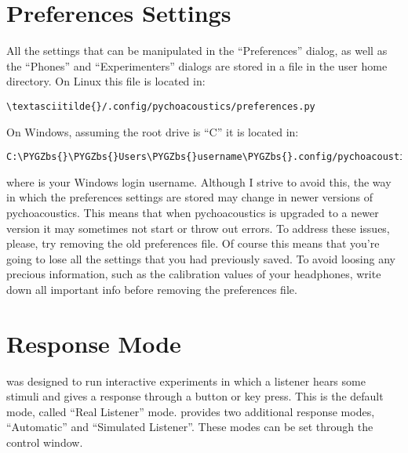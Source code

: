 \documentclass[a4paper,12pt,english]{sphinxmanual}
\def\PYGZbs{\char`\\}
\begin{document}
\section{Preferences Settings}
\label{engine:preferences-settings}
All the settings that can be manipulated in the
“Preferences” dialog, as well as the “Phones” and “Experimenters”
dialogs are stored in a file in the user home directory. On Linux this
file is located in:

\begin{Verbatim}[commandchars=\\\{\}]
\textasciitilde{}/.config/pychoacoustics/preferences.py
\end{Verbatim}

On Windows, assuming the root drive is “C” it is located in:

\begin{Verbatim}[commandchars=\\\{\}]
C:\PYGZbs{}\PYGZbs{}Users\PYGZbs{}username\PYGZbs{}.config/pychoacoustics\PYGZbs{}preferences.py
\end{Verbatim}

where  is your Windows login username. Although I strive to
avoid this, the way in which the preferences settings are stored may
change in newer versions of pychoacoustics. This means that when
pychoacoustics is upgraded to a newer version it may sometimes not start
or throw out errors. To address these issues, please, try removing the
old preferences file. Of course this means that you’re going to lose all
the settings that you had previously saved. To avoid loosing any
precious information, such as the calibration values of your headphones,
write down all important info before removing the preferences file.


\section{Response Mode}
\label{engine:response-mode}\label{engine:sec-response-mode}
 was designed to run interactive experiments in which
a listener hears some stimuli and gives a response through a button or
key press. This is the default mode, called “Real Listener” mode.
 provides two additional response modes, “Automatic”
and “Simulated Listener”. These modes can be set through the control
window.
\end{document}
